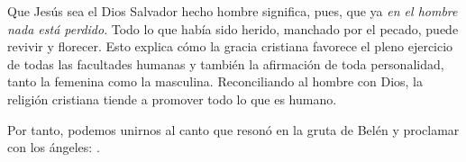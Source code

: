\begin{body}
	Que Jesús sea el Dios Salvador hecho hombre significa, pues, que ya \emph{en el hombre nada está perdido}. Todo lo que había sido herido, manchado por el pecado, puede revivir y florecer. Esto explica cómo la gracia cristiana favorece el pleno ejercicio de todas las facultades humanas y también la afirmación de toda personalidad, tanto la femenina como la masculina. Reconciliando al hombre con Dios, la religión cristiana tiende a promover todo lo que es humano.
	
	Por tanto, podemos unirnos al canto que resonó en la gruta de Belén y proclamar con los ángeles: .					
\end{body}